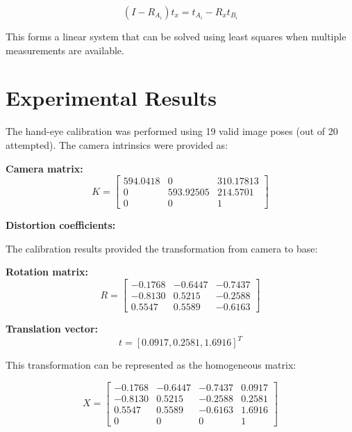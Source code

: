 \documentclass{article}
\begin{document}
\begin{equation}
(I - R_{A_i}) t_x = t_{A_i} - R_x t_{B_i}
\end{equation}

This forms a linear system that can be solved using least squares when multiple measurements are available.

\section{Experimental Results}
The hand-eye calibration was performed using 19 valid image poses (out of 20 attempted). The camera intrinsics were provided as:

\textbf{Camera matrix:}
\begin{equation}
K = \begin{bmatrix}
594.0418 & 0 & 310.17813 \\
0 & 593.92505 & 214.5701 \\
0 & 0 & 1
\end{bmatrix}
\end{equation}

\textbf{Distortion coefficients:}
\begin{equation}
[-0.4783, 0.3981, 0.000756, 0.0002098, -0.3071]
\end{equation}

The calibration results provided the transformation from camera to base:

\textbf{Rotation matrix:}
\begin{equation}
R = \begin{bmatrix}
-0.1768 & -0.6447 & -0.7437 \\
-0.8130 & 0.5215 & -0.2588 \\
0.5547 & 0.5589 & -0.6163
\end{bmatrix}
\end{equation}

\textbf{Translation vector:}
\begin{equation}
t = [0.0917, 0.2581, 1.6916]^T
\end{equation}

This transformation can be represented as the homogeneous matrix:

\begin{equation}
X = \begin{bmatrix}
-0.1768 & -0.6447 & -0.7437 & 0.0917 \\
-0.8130 & 0.5215 & -0.2588 & 0.2581 \\
0.5547 & 0.5589 & -0.6163 & 1.6916 \\
0 & 0 & 0 & 1
\end{bmatrix}
\end{equation}
\end{document}
